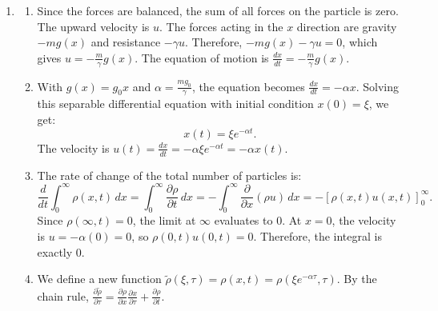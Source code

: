 \documentclass{article}
\begin{document}
\begin{enumerate}[label=\fbox{\arabic*}]
\begin{enumerate}[label=(\arabic*)]
                \[
                  \frac{d}{dt} V = ax^2 + ay^2 + az^2 + 2xy \le ax^2 + ay^2 + az^2 + (x^2 + y^2) = (a+1)(x^2 + y^2) + az^2.
                \]
                Let $\mu = \max(a+1, a) = a+1$. Since $a < -1$, $\mu < 0$.
                Then $\frac{d}{dt} V \le \mu (x^2 + y^2) + \mu z^2 = 2\mu V$.
                By Gronwall's inequality, $V(t) \le V(0) e^{2\mu t}$.
                Since $\mu < 0$, we have $\lim_{t\to\infty} V(t) = 0$. Since $V = \frac{1}{2}(x^2+y^2+z^2)$, this implies $x, y, z \to 0$ as $t \to \infty$. Thus, all solutions converge to the origin.
        \end{enumerate}

  \item %
        \begin{enumerate}[label=(\arabic*)]
          \item Since the forces are balanced, the sum of all forces on the particle is zero.
                The upward velocity is $u$. The forces acting in the $x$ direction are gravity $-mg(x)$ and resistance $-\gamma u$.
                Therefore, $-mg(x) - \gamma u = 0$, which gives $u = -\frac{m}{\gamma} g(x)$.
                The equation of motion is $\frac{dx}{dt} = -\frac{m}{\gamma} g(x)$.
          \item With $g(x) = g_0 x$ and $\alpha = \frac{mg_0}{\gamma}$, the equation becomes $\frac{dx}{dt} = -\alpha x$.
                Solving this separable differential equation with initial condition $x(0) = \xi$, we get:
                \[
                  x(t) = \xi e^{-\alpha t}.
                \]
                The velocity is $u(t) = \frac{dx}{dt} = -\alpha \xi e^{-\alpha t} = -\alpha x(t)$.
          \item The rate of change of the total number of particles is:
                \[
                  \frac{d}{dt} \int_0^\infty \rho(x, t) \, dx = \int_0^\infty \frac{\partial \rho}{\partial t} \, dx = -\int_0^\infty \frac{\partial}{\partial x} (\rho u) \, dx = -[\rho(x, t) u(x, t)]_0^\infty.
                \]
                Since $\rho(\infty, t) = 0$, the limit at $\infty$ evaluates to 0. At $x=0$, the velocity is $u = -\alpha(0) = 0$, so $\rho(0, t) u(0, t) = 0$.
                Therefore, the integral is exactly 0.
          \item We define a new function $\tilde{\rho}(\xi, \tau) = \rho(x, t) = \rho(\xi e^{-\alpha \tau}, \tau)$.
                By the chain rule, $\frac{\partial \tilde{\rho}}{\partial \tau} = \frac{\partial \rho}{\partial x} \frac{\partial x}{\partial \tau} + \frac{\partial \rho}{\partial t}$.

\end{enumerate}
\end{enumerate}
\end{document}
